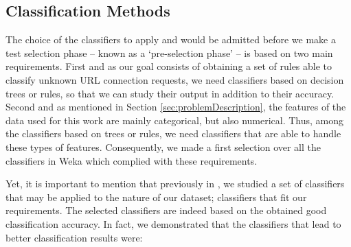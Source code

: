 \documentclass{llncs}
\begin{document}
%
\subsection{Classification Methods}
\label{subsec:methods}

\noindent The choice of the classifiers to apply and would be admitted
before we make a test selection phase -- known as a `pre-selection
phase' -- is based on two main requirements. First and as our goal
consists of obtaining a set of rules able to classify unknown URL
connection requests,  we need classifiers based on decision trees or
rules, so that we can study their output in addition to their
accuracy. Second and as mentioned in Section
\ref{sec:problemDescription}, the features of the data used for this
work are mainly categorical, but also numerical. Thus, among the
classifiers based on trees or rules, we need classifiers that are able
to handle these types of features. Consequently, we made a first
selection over all the classifiers in Weka which complied with these
requirements. 

Yet, it is important to mention that previously in \cite{ECTA}, we studied a set of classifiers that may be applied to the nature of our dataset; classifiers that fit our requirements. The selected classifiers are indeed based on the obtained good classification accuracy. In fact, we demonstrated that the classifiers that lead to better classification results were:
\end{document}
